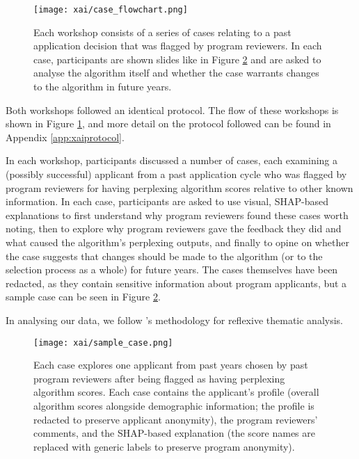 \begin{figure}[htbp]
    \centering
    \texttt{[image: xai/case\_flowchart.png]}
    \caption{Each workshop consists of a series of cases relating to a past application decision that was flagged by program reviewers. In each case, participants are shown slides like in Figure \ref{fig:sample_case} and are asked to analyse the algorithm itself and whether the case warrants changes to the algorithm in future years.}
    \label{fig:case_flowchart}
\end{figure}

Both workshops followed an identical protocol. The flow of these workshops is shown in Figure \ref{fig:case_flowchart}, and more detail on the protocol followed can be found in Appendix \ref{app:xaiprotocol}.

In each workshop, participants discussed a number of cases, each examining a (possibly successful) applicant from a past application cycle who was flagged by program reviewers for having perplexing algorithm scores relative to other known information. In each case, participants are asked to use visual, SHAP-based explanations to first understand why program reviewers found these cases worth noting, then to explore why program reviewers gave the feedback they did and what caused the algorithm's perplexing outputs, and finally to opine on whether the case suggests that changes should be made to the algorithm (or to the selection process as a whole) for future years. The cases themselves have been redacted, as they contain sensitive information about program applicants, but a sample case can be seen in Figure \ref{fig:sample_case}.

In analysing our data, we follow \textcite{braun_using_2006}'s methodology for reflexive thematic analysis. 

\begin{figure}[htbp]
    \centering
    \texttt{[image: xai/sample\_case.png]}
    \caption{Each case explores one applicant from past years chosen by past program reviewers after being flagged as having perplexing algorithm scores. Each case contains the applicant's profile (overall algorithm scores alongside demographic information; the profile is redacted to preserve applicant anonymity), the program reviewers' comments, and the SHAP-based explanation (the score names are replaced with generic labels to preserve program anonymity).}
    \label{fig:sample_case}
    
\end{figure}

